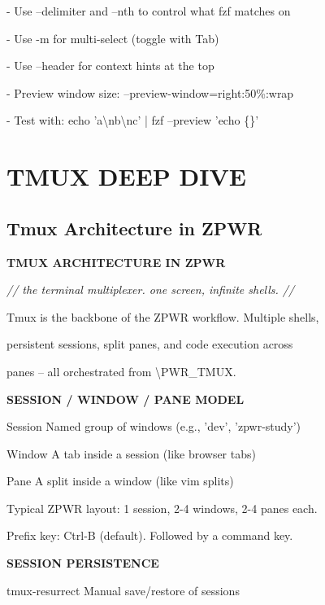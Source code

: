\documentclass[11pt,a4paper,twoside]{book}
\begin{document}
- Use --delimiter and --nth to control what fzf matches on

- Use -m for multi-select (toggle with Tab)

- Use --header for context hints at the top

- Preview window size: --preview-window=right:50\%:wrap

- Test with: echo 'a\textbackslash{}nb\textbackslash{}nc' | fzf --preview 'echo \{\}'


\vspace{16pt}


\chapter{TMUX DEEP DIVE}

\section{Tmux Architecture in ZPWR}


\vspace{10pt}
{\large\bfseries\color{neoncyan} TMUX ARCHITECTURE IN ZPWR}\vspace{6pt}

{\small\itshape\color{dimtext} // the terminal multiplexer. one screen, infinite shells. //}

Tmux is the backbone of the ZPWR workflow. Multiple shells,

persistent sessions, split panes, and code execution across

panes -- all orchestrated from \textbackslash{}PWR\_TMUX.


\vspace{12pt}
{\bfseries\color{neonyellow} SESSION / WINDOW / PANE MODEL}\vspace{4pt}

Session    Named group of windows (e.g., 'dev', 'zpwr-study')

Window     A tab inside a session (like browser tabs)

Pane       A split inside a window (like vim splits)

Typical ZPWR layout: 1 session, 2-4 windows, 2-4 panes each.

Prefix key: Ctrl-B (default). Followed by a command key.


\vspace{12pt}
{\bfseries\color{neonyellow} SESSION PERSISTENCE}\vspace{4pt}

tmux-resurrect   Manual save/restore of sessions
\end{document}
